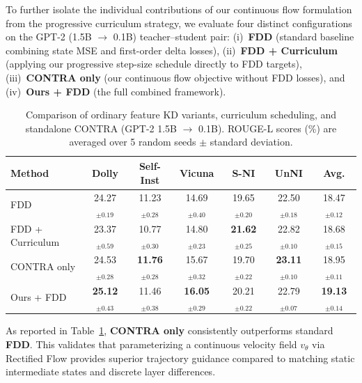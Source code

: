 \documentclass{article} %
\theoremstyle{definition}
\theoremstyle{remark}
\begin{document}
To further isolate the individual contributions of our continuous flow formulation from the progressive curriculum strategy, we evaluate four distinct configurations on the GPT-2 (1.5B $\rightarrow$ 0.1B) teacher--student pair: (i)~\textbf{FDD} (standard baseline combining state MSE and first-order delta losses), (ii)~\textbf{FDD + Curriculum} (applying our progressive step-size schedule directly to FDD targets), (iii)~\textbf{CONTRA only} (our continuous flow objective without FDD losses), and (iv)~\textbf{Ours + FDD} (the full combined framework).

\begin{table}[htbp]
\centering
\small
\setlength{\tabcolsep}{4.5pt}
\caption{Comparison of ordinary feature KD variants, curriculum scheduling, and standalone CONTRA (GPT-2 1.5B $\rightarrow$ 0.1B). ROUGE-L scores (\%) are averaged over 5 random seeds $\pm$ standard deviation.}
\label{tab:feature_kd_ablation}
\begin{tabular}{lcccccc}
\toprule
\textbf{Method} & \textbf{Dolly} & \textbf{Self-Inst} & \textbf{Vicuna} & \textbf{S-NI} & \textbf{UnNI} & \textbf{Avg.} \\
\midrule
FDD              & 24.27$_{\pm 0.19}$          & 11.23$_{\pm 0.28}$          & 14.69$_{\pm 0.40}$          & 19.65$_{\pm 0.20}$          & 22.50$_{\pm 0.18}$          & 18.47$_{\pm 0.12}$ \\
FDD + Curriculum & 23.37$_{\pm 0.59}$          & 10.77$_{\pm 0.30}$          & 14.80$_{\pm 0.23}$          & \textbf{21.62}$_{\pm 0.25}$ & 22.82$_{\pm 0.10}$          & 18.68$_{\pm 0.15}$ \\
CONTRA only      & 24.53$_{\pm 0.28}$          & \textbf{11.76}$_{\pm 0.28}$ & 15.67$_{\pm 0.32}$          & 19.70$_{\pm 0.22}$          & \textbf{23.11}$_{\pm 0.10}$ & 18.95$_{\pm 0.11}$ \\
\midrule
Ours + FDD       & \textbf{25.12}$_{\pm 0.43}$ & 11.46$_{\pm 0.38}$          & \textbf{16.05}$_{\pm 0.29}$ & 20.21$_{\pm 0.22}$          & 22.79$_{\pm 0.07}$          & \textbf{19.13}$_{\pm 0.14}$ \\
\bottomrule
\end{tabular}
\end{table}

As reported in Table~\ref{tab:feature_kd_ablation}, \textbf{CONTRA only} consistently outperforms standard \textbf{FDD}. This validates that parameterizing a continuous velocity field $v_\theta$ via Rectified Flow provides superior trajectory guidance compared to matching static intermediate states and discrete layer differences.
\end{document}
